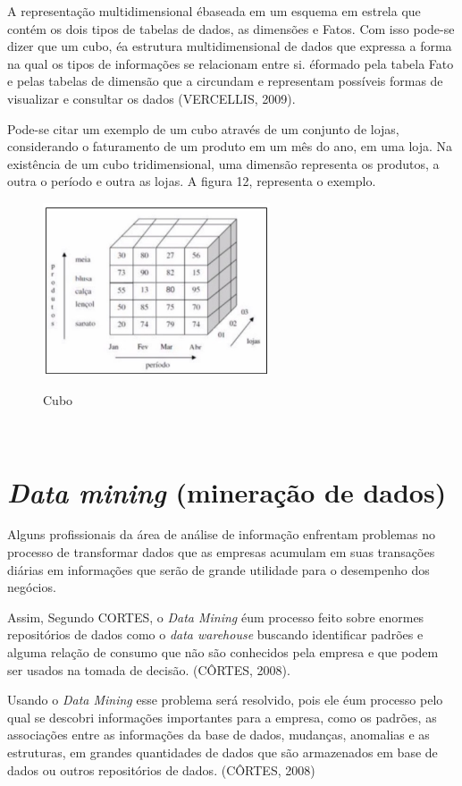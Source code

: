 A representação multidimensional \'{e}baseada em um esquema em estrela que contém os dois tipos de tabelas de dados, as dimensões e Fatos.
Com isso pode-se dizer que um cubo, \'{e}a estrutura multidimensional de dados que expressa a forma na qual os tipos de informações se relacionam entre si. \'{e}formado pela tabela Fato e pelas tabelas de dimensão que a circundam e representam possíveis formas de visualizar e consultar os dados (VERCELLIS, 2009).

Pode-se citar um exemplo de um cubo através de um conjunto de lojas, considerando o faturamento de um produto em um mês do ano, em uma loja. Na existência de um cubo tridimensional, uma dimensão representa os produtos, a outra o período e outra as lojas. A figura 12,  representa o exemplo.

\begin{figure}[H]
	\vspace*{0,2cm}
    \centering
    \caption{Cubo}
    \includegraphics[width=0.6\textwidth]{./04-figuras/figura-12}
    \label{fig:ilustfig12}
\end{figure}
\vspace*{-0,9cm}
{\raggedright {}} \\

\section{\textit{Data mining} (minera\c{c}\~{a}o de dados)}

Alguns profissionais da área de análise de informação enfrentam problemas no processo de transformar dados que as empresas acumulam em suas transações diárias em informações que serão de grande utilidade para o desempenho dos negócios. 

Assim, Segundo CORTES, o \textit{Data Mining} \'{e}um processo feito sobre enormes repositórios de dados como o \textit{data warehouse} buscando identificar padrões e alguma relação de consumo que não são conhecidos pela empresa e que podem ser usados na tomada de decisão. (CÔRTES, 2008).

Usando o \textit{Data Mining} esse problema será resolvido, pois ele \'{e}um processo pelo qual se descobri informações importantes para a empresa, como os padrões, as associações entre as informações da base de dados, mudanças, anomalias e as estruturas, em grandes quantidades de dados que são armazenados em base de dados ou outros repositórios de dados. (CÔRTES, 2008)

